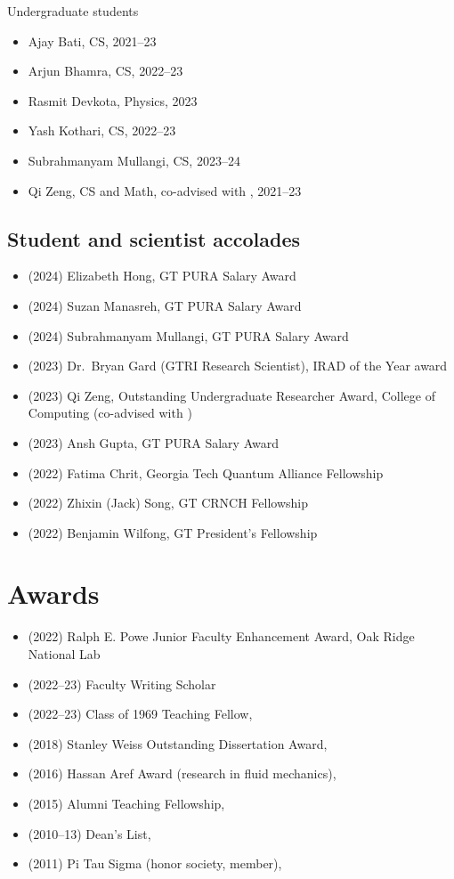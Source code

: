 Undergraduate students
\begin{itemize}
    \item Ajay Bati, CS, 2021--23
    \item Arjun Bhamra, CS, 2022--23
    \item Rasmit Devkota, Physics, 2023
    \item Yash Kothari, CS, 2022--23
    \item Subrahmanyam Mullangi, CS, 2023--24
    \item Qi Zeng, CS and Math, co-advised with \Florian, 2021--23
\end{itemize}

\subsection{Student and scientist accolades}

\begin{itemize}
    \item (2024) Elizabeth Hong, GT PURA Salary Award
    \item (2024) Suzan Manasreh, GT PURA Salary Award
    \item (2024) Subrahmanyam Mullangi, GT PURA Salary Award
    \item (2023) Dr.\ Bryan Gard (GTRI Research Scientist), IRAD of the Year award
    \item (2023) Qi Zeng, Outstanding Undergraduate Researcher Award, College of Computing (co-advised with \Florian)
    \item (2023) Ansh Gupta, GT PURA Salary Award
    \item (2022) Fatima Chrit, Georgia Tech Quantum Alliance Fellowship
    \item (2022) Zhixin (Jack) Song, GT CRNCH Fellowship
    \item (2022) Benjamin Wilfong, GT President's Fellowship
\end{itemize}

\section{Awards}

\begin{itemize}
    \item (2022) Ralph E. Powe Junior Faculty Enhancement Award, Oak Ridge National Lab
    \item (2022--23) \GT Faculty Writing Scholar
    \item (2022--23) Class of 1969 Teaching Fellow, \GIT
    \item (2018) Stanley Weiss Outstanding Dissertation Award, \UIUC
    \item (2016) Hassan Aref Award (research in fluid mechanics), \UIUC
    \item (2015) Alumni Teaching Fellowship, \UIUC
    \item (2010--13) Dean's List, \UMD
    \item (2011) Pi Tau Sigma (honor society, member), \UMD
\end{itemize}

